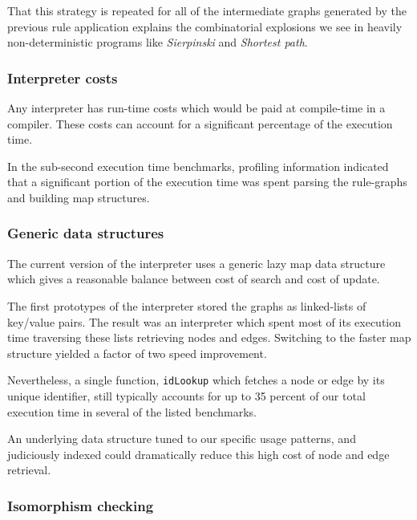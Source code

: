 That this strategy is repeated for all of the intermediate graphs generated by the previous rule application explains the combinatorial explosions we see in heavily non-deterministic programs like \textit{Sierpinski} and \textit{Shortest path}.

\subsubsection*{Interpreter costs}

Any interpreter has run-time costs which would be paid at compile-time in a compiler. These costs can account for a significant percentage of the execution time.

In the sub-second execution time benchmarks, profiling information indicated that a significant portion of the execution time was spent parsing the rule-graphs and building map structures.




\subsubsection*{Generic data structures}

The current version of the interpreter uses a generic lazy map data structure which gives a reasonable balance between cost of search and cost of update. 



The first prototypes of the interpreter stored the graphs as linked-lists of key/value pairs. The result was an interpreter which spent most of its execution time traversing these lists retrieving nodes and edges. Switching to the faster map structure yielded a factor of two speed improvement.

Nevertheless, a single function, \texttt{idLookup} which fetches a node or edge by its unique identifier, still typically accounts for up to 35 percent of our total execution time in several of the listed benchmarks.

An underlying data structure tuned to our specific usage patterns, and judiciously indexed could dramatically reduce this high cost of node and edge retrieval.


\subsubsection*{Isomorphism checking}

